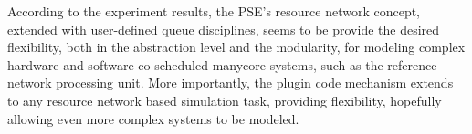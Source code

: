 According to the experiment results, the PSE's resource network concept, extended with user-defined queue disciplines, seems to be provide the desired flexibility, both in the abstraction level and the modularity, for modeling complex hardware and software co-scheduled manycore systems, such as the reference network processing unit. More importantly, the plugin code mechanism extends to any resource network based simulation task, providing flexibility, hopefully allowing even more complex systems to be modeled.


